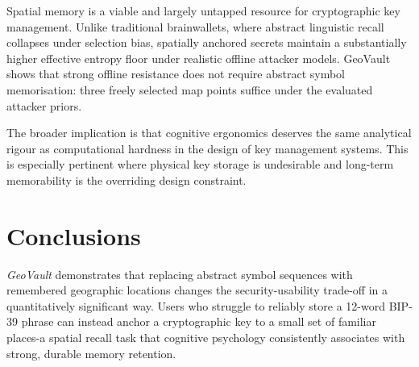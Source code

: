 \documentclass[journal,article,submit,pdftex,moreauthors]{Definitions/mdpi}
\newcommand{\add}[1]{#1}
\newcommand{\remove}[1]{}
\newcommand{\add}[1]{\added{#1}}
\newcommand{\remove}[1]{\deleted{#1}}
\begin{document}
\remove{The findings of this study suggest that spatial memory constitutes a viable and underutilized resource for cryptographic key management. By aligning security mechanisms with a cognitive domain in which humans demonstrate strong long-term retention, GeoVault shows that strong offline resistance need not be achieved at the expense of usability. Unlike traditional brainwallets, which rely on abstract linguistic recall and suffer severe entropy collapse, spatially anchored mnemonics provide a higher baseline of effective entropy under realistic attacker models.

More broadly, GeoVault illustrates how hardware-enforced asymmetry and cognitive ergonomics can be combined to design secure systems that remain usable under real-world constraints. This perspective opens new directions for key management, particularly in scenarios where physical storage of secrets is undesirable or impractical, and where long-term memorability is a primary concern.}\add{Spatial memory is a viable and largely untapped resource for cryptographic key management. Unlike traditional brainwallets, where abstract linguistic recall collapses under selection bias, spatially anchored secrets maintain a substantially higher effective entropy floor under realistic offline attacker models. GeoVault shows that strong offline resistance does not require abstract symbol memorisation: three freely selected map points suffice under the evaluated attacker priors.

The broader implication is that cognitive ergonomics deserves the same analytical rigour as computational hardness in the design of key management systems. This is especially pertinent where physical key storage is undesirable and long-term memorability is the overriding design constraint.}

\section{Conclusions}

\remove{This work introduced \textit{GeoVault}, a spatially anchored key management framework that leverages human spatial memory in combination with memory-hard cryptographic primitives to address persistent security-usability limitations in mnemonic-based secret storage. By grounding key derivation in spatial locations rather than purely linguistic inputs, GeoVault exploits a cognitive capability that is well-supported by empirical research, while remaining compatible with standard offline cryptographic threat models.}\add{\textit{GeoVault} demonstrates that replacing abstract symbol sequences with remembered geographic locations changes the security-usability trade-off in a quantitatively significant way. Users who struggle to reliably store a 12-word BIP-39 phrase can instead anchor a cryptographic key to a small set of familiar places-a spatial recall task that cognitive psychology consistently associates with strong, durable memory retention.}
\end{document}
